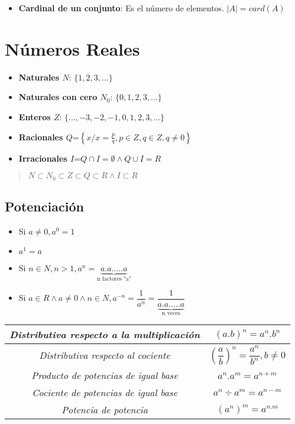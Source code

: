 \documentclass[10pt]{article}
\begin{document}
\begin{itemize}
\item \textbf{Cardinal de un conjunto}: Es el número de elementos. $|A| = card(A)$
\end{itemize}

\newpage
\section{Números Reales}
\begin{multicols}{2}
\begin{itemize}
\item \textbf{Naturales $N$}: $\{1,2,3,...\}$
\item \textbf{Naturales con cero $N_0$}: $\{0,1,2,3,...\}$
\item \textbf{Enteros $Z$}: $\{...,-3,-2,-1,0,1,2,3,...\}$
\item \textbf{Racionales $Q$}=$\left\{x/x=\frac{p}{q},p \in Z, q \in Z, q \not = 0\right\}$
\item \textbf{Irracionales $I$}=$Q \cap I = \emptyset \land Q \cup I = R$
\end{itemize}
\end{multicols}
\begin{quote}
\begin{center}
$N \subset N_0 \subset Z \subset Q \subset R \land I \subset R$
\end{center}
\end{quote}
\subsection{Potenciación}
\begin{multicols}{2}
\begin{itemize}
\item Si $a \not = 0, a^0 = 1$
\item $a^1 = a$
\item Si $n \in N, n>1, a^n = \underbrace{a.a. ... . a}_\text{n factores "a"}$
\item Si $a \in R \land a \not = 0 \land n \in N, a^{-n} = \dfrac{1}{a^n}=\dfrac{1}{\underbrace{a.a. ... . a}_\text{n veces}}$
\end{itemize}
\end{multicols}
\begin{table}[h]
\begin{center}
\begin{tabular}{|c|c|}
\hline
\textit{Distributiva respecto a la multiplicación}&$(a.b)^n=a^n.b^n$\\
\hline
\textit{Distributiva respecto al cociente}&$\left(\dfrac{a}{b}\right)^n = \dfrac{a^n}{b^n}, b \not = 0$\\
\hline
\textit{Producto de potencias de igual base}&$a^n.a^m = a^{n+m}$\\
\hline
\textit{Cociente de potencias de igual base}&$a^n \div a^m = a^{n-m}$\\
\hline
\textit{Potencia de potencia}&$\left(a^n\right)^m = a^{n.m}$\\
\hline
\end{tabular}
\end{center}
\end{table}
\end{document}
